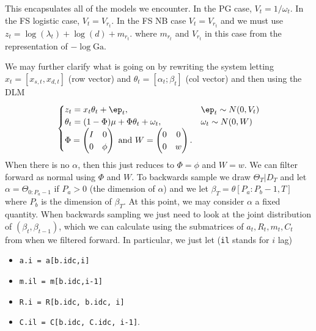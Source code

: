 \documentclass{article}
\newcommand{\Ga}{\text{Ga}}
\begin{document}
This encapsulates all of the models we encounter.  In the PG case, $V_t =
1/\omega_t$.  In the FS logistic case, $V_t = V_{r_t}$.  In the FS NB case $V_t
= V_{r_t}$ and we must use $z_t = \log(\lambda_t) + \log(d) + m_{r_t}$. where
$m_{r_t}$ and $V_{r_t}$ in this case from the representation of $-\log \Ga$.

We may further clarify what is going on by rewriting the system letting $x_t =
[x_{s,t}, x_{d,t}]$ (row vector) and $\theta_t = [\alpha_t; \beta_t]$ (col
vector) and then using the DLM
\[
\begin{cases}
z_t = x_t \theta_t + \ep_t, & \ep_t \sim N(0, V_t) \\
\theta_t = (1-\Phi) \mu + \Phi \theta_t + \omega_t, & \omega_t \sim N(0, W) \\
\Phi = 
\begin{pmatrix}
I & 0 \\
0 & \phi
\end{pmatrix}
\text{ and }
W = 
\begin{pmatrix}
0 & 0 \\
0 & w
\end{pmatrix}.
\end{cases}
\]
When there is no $\alpha$, then this just reduces to $\Phi = \phi$ and $W = w$.
We can filter forward as normal using $\Phi$ and $W$.  To backwards sample we
draw $\Theta_T | D_T$ and let $\alpha = \Theta_{0:P_a-1}$ if $P_a > 0$ (the
dimension of $\alpha$) and we let $\beta_T = \theta[P_a:P_b-1,T]$ where $P_b$ is
the dimension of $\beta_T$.  At this point, we may consider $\alpha$ a fixed
quantity.  When backwards sampling we just need to look at the joint
distribution of $(\beta_t, \beta_{t-1})$, which we can calculate using the
submatrices of $a_t, R_t, m_t, C_t$ from when we filtered forward.  In
particular, we just let (\texttt{il} stands for $i$ lag)
\begin{itemize}
\item \texttt{a.i  = a[b.idc,i]}
\item \texttt{m.il = m[b.idc,i-1]}
\item \texttt{R.i  = R[b.idc, b.idc, i]}
\item \texttt{C.il = C[b.idc, C.idc, i-1]}.
\end{itemize}
\end{document}
